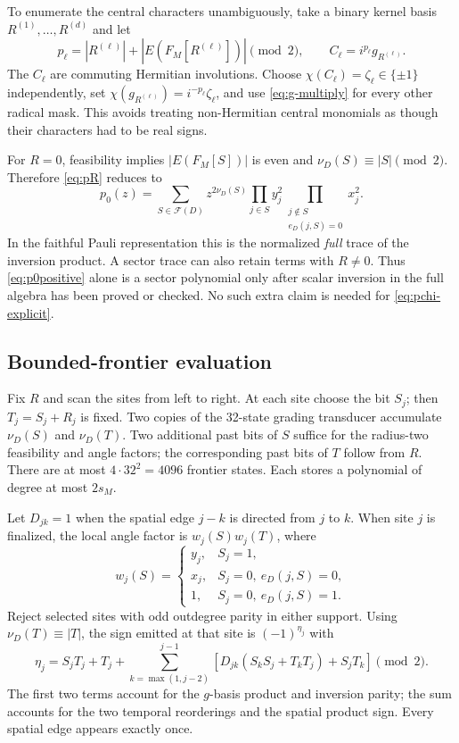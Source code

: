 \documentclass[10pt,letterpaper]{article}
\newcommand{\Ffam}{\mathcal F}
\begin{document}
To enumerate the central characters unambiguously, take a binary kernel basis $R^{(1)},\ldots,R^{(d)}$ and let
\[
 p_\ell=|R^{(\ell)}|+|E(F_M[R^{(\ell)}])|\pmod2,
 \qquad C_\ell=i^{p_\ell}g_{R^{(\ell)}}.
\]
The $C_\ell$ are commuting Hermitian involutions. Choose $\chi(C_\ell)=\zeta_\ell\in\{\pm1\}$ independently, set $\chi(g_{R^{(\ell)}})=i^{-p_\ell}\zeta_\ell$, and use \eqref{eq:g-multiply} for every other radical mask. This avoids treating non-Hermitian central monomials as though their characters had to be real signs.

For $R=0$, feasibility implies $|E(F_M[S])|$ is even and $\nu_D(S)\equiv|S|\pmod2$. Therefore \eqref{eq:pR} reduces to
\begin{equation}\label{eq:p0positive}
 p_0(z)=\sum_{S\in\Ffam(D)}z^{2\nu_D(S)}
       \prod_{j\in S}y_j^2
       \prod_{\substack{j\notin S\\e_D(j,S)=0}}x_j^2.
\end{equation}
In the faithful Pauli representation this is the normalized \emph{full} trace of the inversion product. A sector trace can also retain terms with $R\ne0$. Thus \eqref{eq:p0positive} alone is a sector polynomial only after scalar inversion in the full algebra has been proved or checked. No such extra claim is needed for \eqref{eq:pchi-explicit}.

\subsection{Bounded-frontier evaluation}
Fix $R$ and scan the sites from left to right. At each site choose the bit $S_j$; then $T_j=S_j+R_j$ is fixed. Two copies of the 32-state grading transducer accumulate $\nu_D(S)$ and $\nu_D(T)$. Two additional past bits of $S$ suffice for the radius-two feasibility and angle factors; the corresponding past bits of $T$ follow from $R$. There are at most $4\cdot32^2=4096$ frontier states. Each stores a polynomial of degree at most $2s_M$.

Let $D_{jk}=1$ when the spatial edge $j-k$ is directed from $j$ to $k$. When site $j$ is finalized, the local angle factor is $w_j(S)w_j(T)$, where
\[
 w_j(S)=\begin{cases}
 y_j,&S_j=1,\\
 x_j,&S_j=0,\ e_D(j,S)=0,\\
 1,&S_j=0,\ e_D(j,S)=1.
 \end{cases}
\]
Reject selected sites with odd outdegree parity in either support. Using $\nu_D(T)\equiv|T|$, the sign emitted at that site is $(-1)^{\eta_j}$ with
\begin{equation}\label{eq:pair-local-sign}
 \eta_j=S_jT_j+T_j+
 \sum_{k=\max(1,j-2)}^{j-1}
 \left[D_{jk}(S_kS_j+T_kT_j)+S_jT_k\right]\pmod2.
\end{equation}
The first two terms account for the $g$-basis product and inversion parity; the sum accounts for the two temporal reorderings and the spatial product sign. Every spatial edge appears exactly once.
\end{document}
